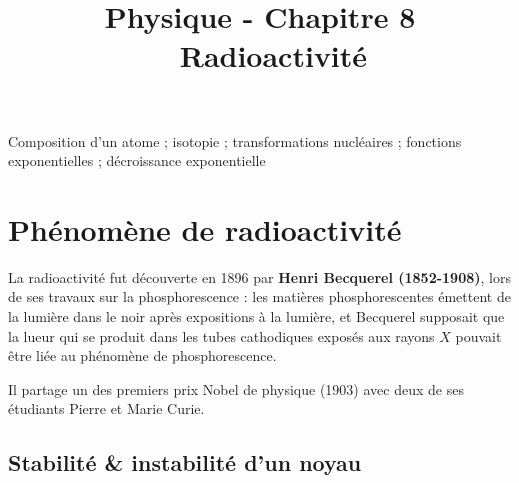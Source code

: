 \documentclass[11pt,a4paper]{article}
\title{\large Physique - Chapitre 8 \\ \LARGE  Radioactivité}
\date{}
\author{}
\begin{document}
\maketitle
\vspace{-1cm}
\begin{tcolorbox}[title=Notions de la classe de première à rappeler]
Composition d'un atome ; isotopie ; transformations nucléaires ;  fonctions exponentielles ; décroissance exponentielle
\end{tcolorbox}
\tableofcontents

\section{Phénomène de radioactivité}
La radioactivité fut découverte en 1896 par \textbf{Henri Becquerel (1852-1908)}, lors de ses travaux sur la phosphorescence : les matières phosphorescentes émettent de la lumière dans le noir après expositions à la lumière, et Becquerel supposait que la lueur qui se produit dans les tubes cathodiques exposés aux rayons $X$ pouvait être liée au phénomène de phosphorescence. 

Il partage un des premiers prix Nobel de physique (1903) avec deux de ses étudiants Pierre et Marie Curie. 

\subsection{Stabilité \& instabilité d'un noyau}
\end{document}
